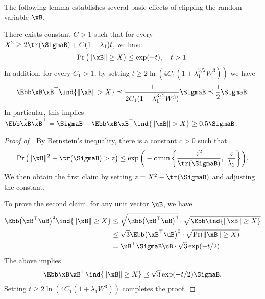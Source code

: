 \documentclass[11pt]{article}
\begin{document}
The following lemma establishes several basic effects of clipping the random variable $\xB$.
\begin{lemma}\label{lemma:norm-tail}
There exists constant $C>1$ such that for every $X^2 \ge 2\tr(\SigmaB) + C(1+\lambda_1)t$, we have 
\begin{align*}
    \Pr\big(\|\xB\| \ge X \big) \le \exp(-t),\quad t>1.
\end{align*}
In addition, for every $C_1>1$, by setting $t \ge 2 \ln(4C_1 (1+\lambda_1^{3/2} W^3))$ we have
\begin{align*}
    \Ebb\xB\xB^\top\ind{\|\xB\|> X} \preceq \frac{1}{2C_1(1+\lambda_1^{3/2} W^3)} \SigmaB \preceq \frac{1}{2}\SigmaB.
\end{align*}
In particular, this implies $\Ebb \tilde\xB\tilde\xB^\top = \SigmaB - \Ebb\xB\xB^\top\ind{\|\xB\|> X} \ge 0.5\SigmaB$.
\end{lemma}
\begin{proof}[Proof of ]
By Bernstein's inequality, there is a constant $c>0$ such that
\begin{align*}
    \Pr\big(\|\xB\|^2 - \tr(\SigmaB)    > z \big) \le \exp\bigg( -c
\min\bigg\{\frac{z^2}{\tr(\SigmaB)},\ \frac{z}{\lambda_1}\bigg\} \bigg).
\end{align*}
We then obtain the first claim by setting $z = X^2 - \tr(\SigmaB)$ and adjusting the constant.






To prove the second claim, for any unit vector $\uB$, we have
\begin{align*}
 \Ebb \big(\xB^\top\uB\big)^2 \ind{\|\xB\|\ge X} 
 &\le \sqrt{\Ebb \big(\xB^\top\uB\big)^4} \cdot \sqrt{\Ebb\ind{\|\xB\|\ge X} }\\
 &\le \sqrt{3} \Ebb \big(\xB^\top\uB\big)^2 \cdot \sqrt{\Pr(\|\xB\|\ge X)} \\
 &=  \uB^\top \SigmaB \uB \cdot \sqrt{3}\exp(-t/2).
\end{align*}
The above implies
\begin{align*}
    \Ebb \xB\xB^\top \ind{\|\xB\|\ge X}  \preceq \sqrt{3}\exp(-t/2)\SigmaB.
\end{align*}
Setting $t \ge 2 \ln(4C_1 (1+\lambda_1 W^3))$ completes the proof.
\end{proof}
\end{document}
